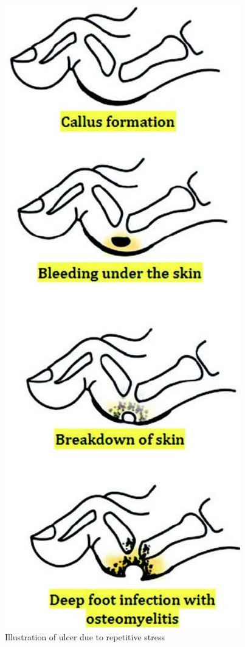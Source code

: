 {\begin{figure}
\includegraphics{images/067.jpg}
\caption{Illustration of ulcer due to repetitive stress}
\end{figure}

}
